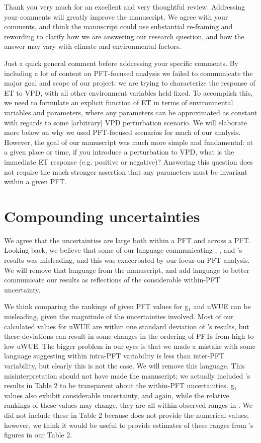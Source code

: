 \RequirePackage{natbib}


Thank you very much for an excellent and very thoughtful
review. Addressing your comments will greatly improve the
manuscript. We agree with your comments, and think the manuscript
could use substantial re-framing and rewording to clarify how we are
answering our research question, and how the answer may vary with
climate and environmental factors.

Just a quick general comment before addressing your specific
comments. By including a lot of content on PFT-focused analysis we
failed to communicate the major goal and scope of our project: we are
trying to characterize the response of ET to VPD, with all other
environment variables held fixed. To accomplish this, we need to
formulate an explicit function of ET in terms of environmental
variables and parameters, where any parameters can be approximated as
constant with regards to some [arbitrary] VPD perturbation
scenario. We will elaborate more below on why we used PFT-focused
scenarios for much of our analysis. However, the goal of our
manuscript was much more simple and fundamental: at a given place or
time, if you introduce a perturbation to VPD, what is the immediate ET
response (e.g. positive or negative)? Answering this question does not
require the much stronger assertion that any parameters must be
invariant within a given PFT.

\section{Compounding uncertainties}

We agree that the uncertainties are large both within a PFT and across
a PFT. Looking back, we believe that some of our language
communicating \cite{Lin_2018}, \cite{Medlyn_2017}, and
\cite{Zhou_2014}'s results was misleading, and this was exacerbated by
our focus on PFT-analysis. We will remove that language from the
manuscript, and add language to better communicate our results as
reflections of the considerable within-PFT uncertainty.

We think comparing the rankings of given PFT values for g$_1$ and uWUE
can be misleading, given the magnitude of the uncertainties
involved. Most of our calculated values for uWUE are within one
standard deviation of \cite{Zhou_2015}'s results, but these deviations
can result in some changes in the ordering of PFTs from high to low
uWUE. The bigger problem in our eyes is that we made a mistake with
some language suggesting within intra-PFT variability is less than
inter-PFT variability, but clearly this is not the case. We will
remove this language. This misinterpretation should not have made the
manuscript; we actually included \cite{Zhou_2015}'s results in Table 2
to be transparent about the within-PFT uncertainties. g$_1$ values
also exhibit considerable uncertainty, and again, while the relative
rankings of these values may change, they are all within observed
ranges in \cite{Medlyn_2017}. We did not include these in Table 2
because \cite{Medlyn_2017} does not provide the numerical values;
however, we think it would be useful to provide estimates of these
ranges from \cite{Medlyn_2017}'s figures in our Table 2.

